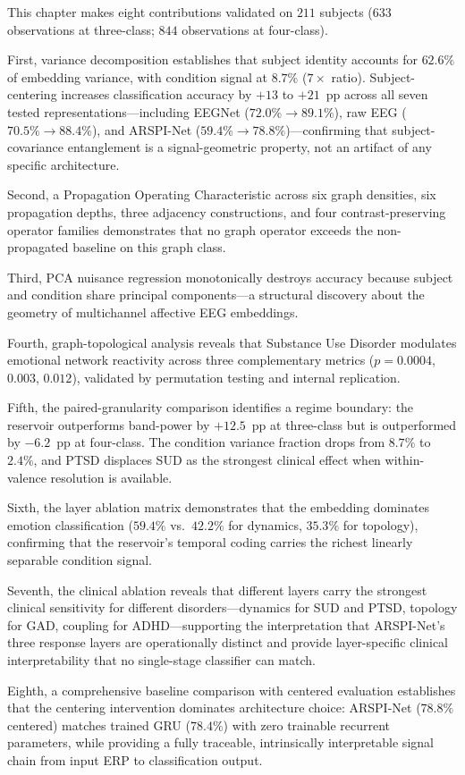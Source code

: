 This chapter makes eight contributions validated on $211$ subjects ($633$ observations at three-class; $844$ observations at four-class).

First, variance decomposition establishes that subject identity accounts for $62.6\%$ of embedding variance, with condition signal at $8.7\%$ ($7\times$ ratio). Subject-centering increases classification accuracy by $+13$ to $+21$~pp across all seven tested representations---including EEGNet ($72.0\% \to 89.1\%$), raw EEG ($70.5\% \to 88.4\%$), and ARSPI-Net ($59.4\% \to 78.8\%$)---confirming that subject-covariance entanglement is a signal-geometric property, not an artifact of any specific architecture.

Second, a Propagation Operating Characteristic across six graph densities, six propagation depths, three adjacency constructions, and four contrast-preserving operator families demonstrates that no graph operator exceeds the non-propagated baseline on this graph class.

Third, PCA nuisance regression monotonically destroys accuracy because subject and condition share principal components---a structural discovery about the geometry of multichannel affective EEG embeddings.

Fourth, graph-topological analysis reveals that Substance Use Disorder modulates emotional network reactivity across three complementary metrics ($p = 0.0004$, $0.003$, $0.012$), validated by permutation testing and internal replication.

Fifth, the paired-granularity comparison identifies a regime boundary: the reservoir outperforms band-power by $+12.5$~pp at three-class but is outperformed by $-6.2$~pp at four-class. The condition variance fraction drops from $8.7\%$ to $2.4\%$, and PTSD displaces SUD as the strongest clinical effect when within-valence resolution is available.

Sixth, the layer ablation matrix demonstrates that the embedding dominates emotion classification ($59.4\%$ vs.\ $42.2\%$ for dynamics, $35.3\%$ for topology), confirming that the reservoir's temporal coding carries the richest linearly separable condition signal.

Seventh, the clinical ablation reveals that different layers carry the strongest clinical sensitivity for different disorders---dynamics for SUD and PTSD, topology for GAD, coupling for ADHD---supporting the interpretation that ARSPI-Net's three response layers are operationally distinct and provide layer-specific clinical interpretability that no single-stage classifier can match.

Eighth, a comprehensive baseline comparison with centered evaluation establishes that the centering intervention dominates architecture choice: ARSPI-Net ($78.8\%$ centered) matches trained GRU ($78.4\%$) with zero trainable recurrent parameters, while providing a fully traceable, intrinsically interpretable signal chain from input ERP to classification output.